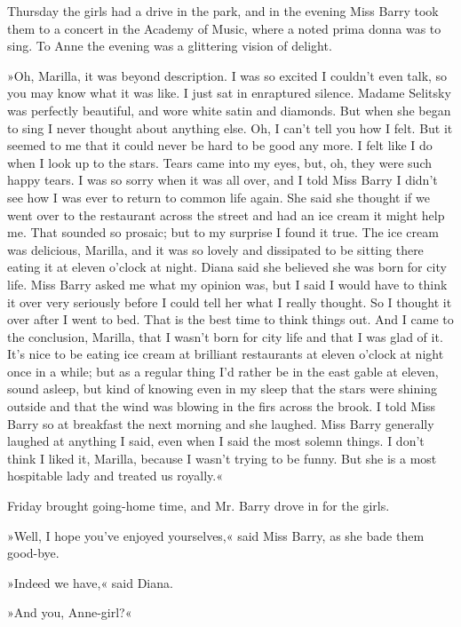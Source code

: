 Thursday the girls had a drive in the park, and in the evening Miss Barry took them to a concert in the Academy of Music, where a noted prima donna was to sing. To Anne the evening was a glittering vision of delight.

»Oh, Marilla, it was beyond description. I was so excited I couldn't even talk, so you may know what it was like. I just sat in enraptured silence. Madame Selitsky was perfectly beautiful, and wore white satin and diamonds. But when she began to sing I never thought about anything else. Oh, I can't tell you how I felt. But it seemed to me that it could never be hard to be good any more. I felt like I do when I look up to the stars. Tears came into my eyes, but, oh, they were such happy tears. I was so sorry when it was all over, and I told Miss Barry I didn't see how I was ever to return to common life again. She said she thought if we went over to the restaurant across the street and had an ice cream it might help me. That sounded so prosaic; but to my surprise I found it true. The ice cream was delicious, Marilla, and it was so lovely and dissipated to be sitting there eating it at eleven o'clock at night. Diana said she believed she was born for city life. Miss Barry asked me what my opinion was, but I said I would have to think it over very seriously before I could tell her what I really thought. So I thought it over after I went to bed. That is the best time to think things out. And I came to the conclusion, Marilla, that I wasn't born for city life and that I was glad of it. It's nice to be eating ice cream at brilliant restaurants at eleven o'clock at night once in a while; but as a regular thing I'd rather be in the east gable at eleven, sound asleep, but kind of knowing even in my sleep that the stars were shining outside and that the wind was blowing in the firs across the brook. I told Miss Barry so at breakfast the next morning and she laughed. Miss Barry generally laughed at anything I said, even when I said the most solemn things. I don't think I liked it, Marilla, because I wasn't trying to be funny. But she is a most hospitable lady and treated us royally.«

Friday brought going-home time, and Mr. Barry drove in for the girls.

»Well, I hope you've enjoyed yourselves,« said Miss Barry, as she bade them good-bye.

»Indeed we have,« said Diana.

»And you, Anne-girl?«

